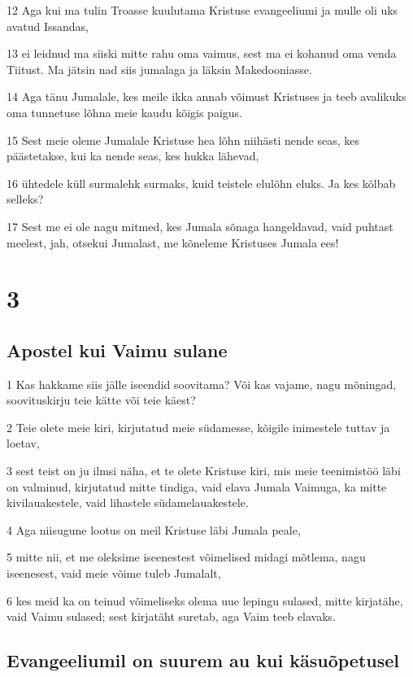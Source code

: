 \par 12 Aga kui ma tulin Troasse kuulutama Kristuse evangeeliumi ja mulle oli uks avatud Issandas,
\par 13 ei leidnud ma siiski mitte rahu oma vaimus, sest ma ei kohanud oma venda Tiitust. Ma jätsin nad siis jumalaga ja läksin Makedooniasse.
\par 14 Aga tänu Jumalale, kes meile ikka annab võimust Kristuses ja teeb avalikuks oma tunnetuse lõhna meie kaudu kõigis paigus.
\par 15 Sest meie oleme Jumalale Kristuse hea lõhn niihästi nende seas, kes päästetakse, kui ka nende seas, kes hukka lähevad,
\par 16 ühtedele küll surmalehk surmaks, kuid teistele elulõhn eluks. Ja kes kõlbab selleks?
\par 17 Sest me ei ole nagu mitmed, kes Jumala sõnaga hangeldavad, vaid puhtast meelest, jah, otsekui Jumalast, me kõneleme Kristuses Jumala ees!


\chapter{3}

\section*{Apostel kui Vaimu sulane}

\par 1 Kas hakkame siis jälle iseendid soovitama? Või kas vajame, nagu mõningad, soovituskirju teie kätte või teie käest?
\par 2 Teie olete meie kiri, kirjutatud meie südamesse, kõigile inimestele tuttav ja loetav,
\par 3 sest teist on ju ilmsi näha, et te olete Kristuse kiri, mis meie teenimistöö läbi on valminud, kirjutatud mitte tindiga, vaid elava Jumala Vaimuga, ka mitte kivilauakestele, vaid lihastele südamelauakestele.
\par 4 Aga niisugune lootus on meil Kristuse läbi Jumala peale,
\par 5 mitte nii, et me oleksime iseenestest võimelised midagi mõtlema, nagu iseenesest, vaid meie võime tuleb Jumalalt,
\par 6 kes meid ka on teinud võimeliseks olema uue lepingu sulased, mitte kirjatähe, vaid Vaimu sulased; sest kirjatäht suretab, aga Vaim teeb elavaks.

\section*{Evangeeliumil on suurem au kui käsuõpetusel}

